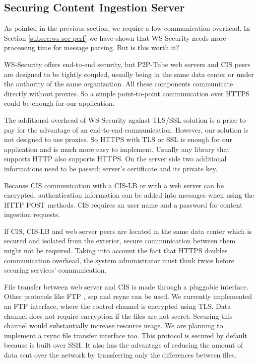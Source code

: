 \subsection{Securing Content Ingestion Server}
\label{subsec:securing-cis}

As pointed in the previous section, we require a low communication overhead. In Section \ref{subsec:ws-sec-perf} we have shown that WS-Security needs more processing time for message parsing. But is this worth it?

WS-Security offers end-to-end security, but P2P-Tube web servers and CIS peers are designed to be tightly coupled, usually being in the same data center or under the authority of the same organization. All these components communicate directly without proxies. So a simple point-to-point communication over HTTPS could be enough for our application.

The additional overhead of WS-Security against TLS/SSL solution is a price to pay for the advantage of an end-to-end communication. However, our solution is not designed to use proxies. So HTTPS with TLS or SSL is enough for our application and is much more easy to implement. Usually any library that supports HTTP also supports HTTPS. On the server side two additional informations need to be passed: server's certificate and its private key.

Because CIS communication with a CIS-LB or with a web server can be encrypted, authentication information can be added into messages when using the HTTP POST methods. CIS requires an user name and a password for content ingestion requests.

If CIS, CIS-LB and web server peers are located in the same data center which is secured and isolated from the exterior, secure communication between them might not be required. Taking into account the fact that HTTPS doubles communication overhead, the system administrator must think twice before securing services' communication.

File transfer between web server and CIS is made through a pluggable interface. Other protocols like FTP \cite{ftp}, scp \cite{scp} and rsync \cite{rsync} can be used. We currently implemented an FTP interface, where the control channel is encrypted using TLS. Data channel does not require encryption if the files are not secret. Securing this channel would substantially increase resource usage. We are planning to implement a rsync file transfer interface too. This protocol is secured by default because is built over SSH. It also has the advantage of reducing the amount of data sent over the network by transferring only the differences between files. 

